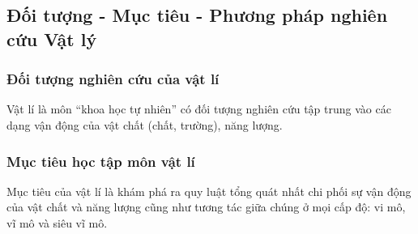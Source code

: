 

\subsection{Đối tượng - Mục tiêu - Phương pháp nghiên cứu Vật lý}
\subsubsection{Đối tượng nghiên cứu của vật lí}
Vật lí là môn ``khoa học tự nhiên'' có đối tượng nghiên cứu tập trung vào các dạng vận động của vật chất (chất, trường), năng lượng.
\subsubsection{Mục tiêu học tập môn vật lí}
Mục tiêu của vật lí là khám phá ra quy luật tổng quát nhất chi phối sự vận động của vật chất và năng lượng cũng như tương tác giữa chúng ở mọi cấp độ: vi mô, vĩ mô và siêu vĩ mô.

